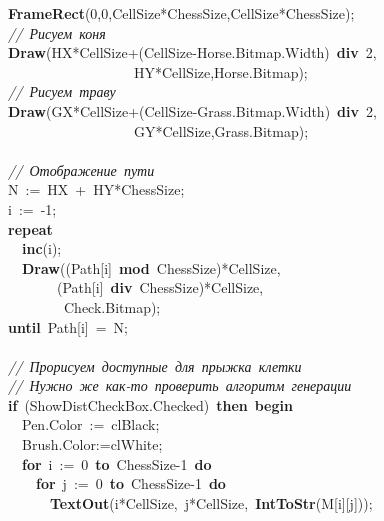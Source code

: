 \mbox{}\ \ \ \ \textbf{FrameRect}(0,0,CellSize*ChessSize,CellSize*ChessSize); \\
\mbox{}\ \ \ \ \textit{//\ Рисуем\ коня} \\
\mbox{}\ \ \ \ \textbf{Draw}(HX*CellSize+(CellSize-Horse.Bitmap.Width)\ \textbf{div}\ 2, \\
\mbox{}\ \ \ \ \ \ \ \ \ \ \ \ \ \ \ \ \ \ \ \ \ \ HY*CellSize,Horse.Bitmap); \\
\mbox{}\ \ \ \ \textit{//\ Рисуем\ траву} \\
\mbox{}\ \ \ \ \textbf{Draw}(GX*CellSize+(CellSize-Grass.Bitmap.Width)\ \textbf{div}\ 2, \\
\mbox{}\ \ \ \ \ \ \ \ \ \ \ \ \ \ \ \ \ \ \ \ \ \ GY*CellSize,Grass.Bitmap); \\
\mbox{} \\
\mbox{}\ \ \ \ \textit{//\ Отображение\ пути} \\
\mbox{}\ \ \ \ N\ :=\ HX\ +\ HY*ChessSize; \\
\mbox{}\ \ \ \ i\ :=\ -1; \\
\mbox{}\ \ \ \ \textbf{repeat} \\
\mbox{}\ \ \ \ \ \ \textbf{inc}(i); \\
\mbox{}\ \ \ \ \ \ \textbf{Draw}((Path[i]\ \textbf{mod}\ ChessSize)*CellSize, \\
\mbox{}\ \ \ \ \ \ \ \ \ \ \ (Path[i]\ \textbf{div}\ ChessSize)*CellSize, \\
\mbox{}\ \ \ \ \ \ \ \ \ \ \ \ Check.Bitmap); \\
\mbox{}\ \ \ \ \textbf{until}\ Path[i]\ =\ N; \\
\mbox{} \\
\mbox{}\ \ \ \ \textit{//\ Прорисуем\ доступные\ для\ прыжка\ клетки} \\
\mbox{}\ \ \ \ \textit{//\ Нужно\ же\ как-то\ проверить\ алгоритм\ генерации} \\
\mbox{}\ \ \ \ \textbf{if}\ (ShowDistCheckBox.Checked)\ \textbf{then}\ \textbf{begin} \\
\mbox{}\ \ \ \ \ \ Pen.Color\ :=\ clBlack; \\
\mbox{}\ \ \ \ \ \ Brush.Color:=clWhite; \\
\mbox{}\ \ \ \ \ \ \textbf{for}\ i\ :=\ 0\ \textbf{to}\ ChessSize-1\ \textbf{do} \\
\mbox{}\ \ \ \ \ \ \ \ \textbf{for}\ j\ :=\ 0\ \textbf{to}\ ChessSize-1\ \textbf{do} \\
\mbox{}\ \ \ \ \ \ \ \ \ \ \textbf{TextOut}(i*CellSize,\ j*CellSize,\ \textbf{IntToStr}(M[i][j])); \\
